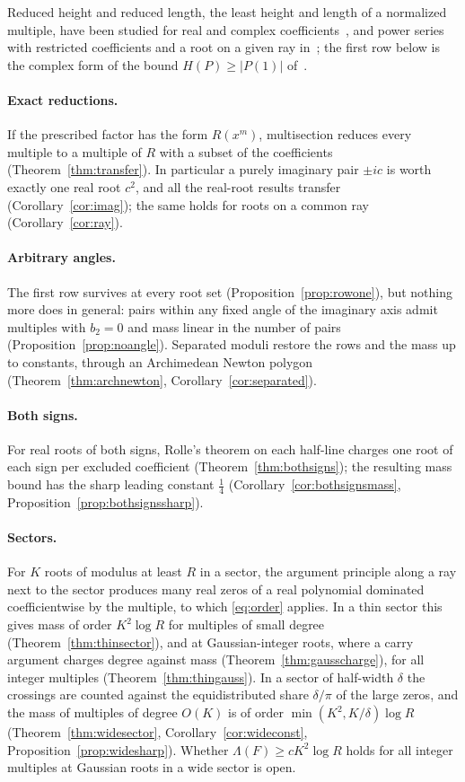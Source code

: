 \documentclass[11pt]{article}
\begin{document}
Reduced height and reduced length, the least height and length of a
normalized multiple, have been studied for real and complex
coefficients~\cite{dj,schinzel-complex}, and power series with restricted
coefficients and a root on a given ray in~\cite{bbbp-ray}; the first row
below is the complex form of the bound $H(P)\ge|P(1)|$ of~\cite{dj}.

\paragraph{Exact reductions.}  If the prescribed factor has the form
$R(x^m)$, multisection reduces every multiple to a multiple of $R$ with a
subset of the coefficients (Theorem~\ref{thm:transfer}).  In particular a
purely imaginary pair $\pm ic$ is worth exactly one real root $c^2$, and all
the real-root results transfer (Corollary~\ref{cor:imag}); the same holds for
roots on a common ray (Corollary~\ref{cor:ray}).

\paragraph{Arbitrary angles.}  The first row survives at every root set
(Proposition~\ref{prop:rowone}), but nothing more does in general: pairs
within any fixed angle of the imaginary axis admit multiples with $b_2=0$
and mass linear in the number of pairs (Proposition~\ref{prop:noangle}).
Separated moduli restore the rows and the mass up to constants, through an
Archimedean Newton polygon (Theorem~\ref{thm:archnewton},
Corollary~\ref{cor:separated}).

\paragraph{Both signs.}  For real roots of both signs, Rolle's theorem on
each half-line charges one root of each sign per excluded coefficient
(Theorem~\ref{thm:bothsigns}); the resulting mass bound has the sharp
leading constant $\frac14$ (Corollary~\ref{cor:bothsignsmass},
Proposition~\ref{prop:bothsignssharp}).

\paragraph{Sectors.}  For $K$ roots of modulus at least $R$ in a sector, the
argument principle along a ray next to the sector produces many real zeros
of a real polynomial dominated coefficientwise by the multiple, to which
\eqref{eq:order} applies.  In a thin sector this gives mass of order
$K^2\log R$ for multiples of small degree (Theorem~\ref{thm:thinsector}), and
at Gaussian-integer roots, where a carry argument charges degree against
mass (Theorem~\ref{thm:gausscharge}), for all integer multiples
(Theorem~\ref{thm:thingauss}).  In a sector of half-width $\delta$ the
crossings are counted against the equidistributed share $\delta/\pi$ of the
large zeros, and the mass of multiples of degree $O(K)$ is of order
$\min(K^2,K/\delta)\log R$ (Theorem~\ref{thm:widesector},
Corollary~\ref{cor:wideconst}, Proposition~\ref{prop:widesharp}).  Whether
$\Lambda(F)\ge cK^2\log R$ holds for all integer multiples at Gaussian roots
in a wide sector is open.
\end{document}
